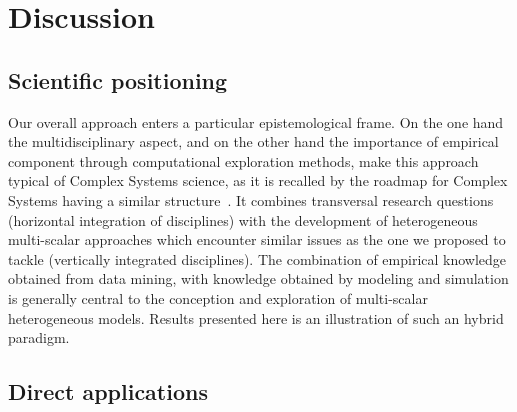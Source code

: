 \documentclass{bmcart}
\begin{document}
\section*{Discussion}


\subsection*{Scientific positioning}


Our overall approach enters a particular epistemological frame. On the one hand the multidisciplinary aspect, and on the other hand the importance of empirical component through computational exploration methods, make this approach typical of Complex Systems science, as it is recalled by the roadmap for Complex Systems having a similar structure~\cite{2009arXiv0907.2221B}. It combines transversal research questions (horizontal integration of disciplines) with the development of heterogeneous multi-scalar approaches which encounter similar issues as the one we proposed to tackle (vertically integrated disciplines). The combination of empirical knowledge obtained from data mining, with knowledge obtained by modeling and simulation is generally central to the conception and exploration of multi-scalar heterogeneous models. Results presented here is an illustration of such an hybrid paradigm.



\subsection*{Direct applications}
\end{document}
